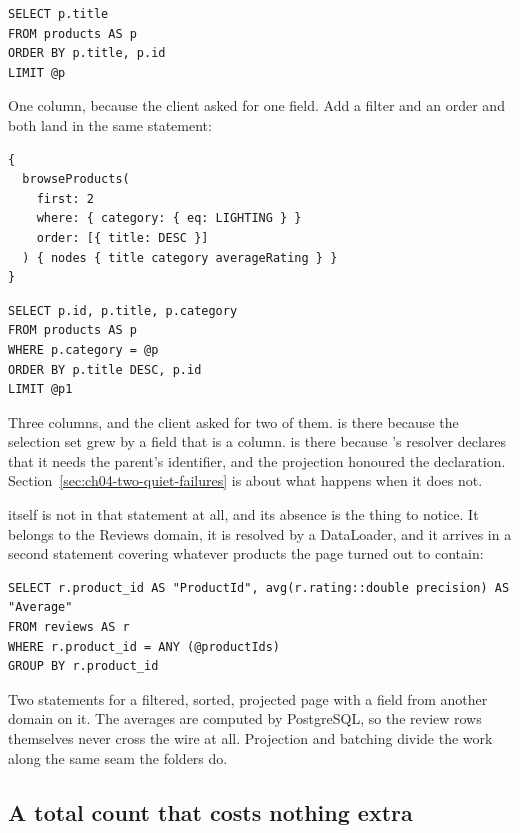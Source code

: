\begin{verbatim}
SELECT p.title
FROM products AS p
ORDER BY p.title, p.id
LIMIT @p
\end{verbatim}

One column, because the client asked for one field. Add a filter and an order
and both land in the same statement:

\begin{verbatim}
{
  browseProducts(
    first: 2
    where: { category: { eq: LIGHTING } }
    order: [{ title: DESC }]
  ) { nodes { title category averageRating } }
}
\end{verbatim}

\begin{verbatim}
SELECT p.id, p.title, p.category
FROM products AS p
WHERE p.category = @p
ORDER BY p.title DESC, p.id
LIMIT @p1
\end{verbatim}

%
Three columns, and the client asked for two of them.  is there
because the selection set grew by a field that is a column.  is there
because 's resolver declares that it needs the parent's
identifier, and the projection honoured the declaration. Section~\ref{sec:ch04-two-quiet-failures}
is about what happens when it does not.

 itself is not in that statement at all, and its absence is
the thing to notice. It belongs to the Reviews domain, it is resolved by a
DataLoader, and it arrives in a second statement covering whatever products the
page turned out to contain:

\begin{verbatim}
SELECT r.product_id AS "ProductId", avg(r.rating::double precision) AS "Average"
FROM reviews AS r
WHERE r.product_id = ANY (@productIds)
GROUP BY r.product_id
\end{verbatim}

Two statements for a filtered, sorted, projected page with a field from another
domain on it. The averages are computed by PostgreSQL, so the review rows
themselves never cross the wire at all. Projection and batching divide the work
along the same seam the folders do.

\subsection*{A total count that costs nothing extra}

